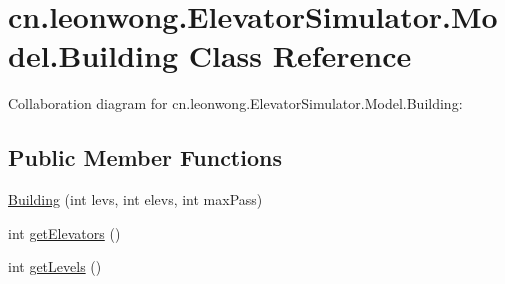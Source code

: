 \hypertarget{classcn_1_1leonwong_1_1_elevator_simulator_1_1_model_1_1_building}{}\section{cn.\+leonwong.\+Elevator\+Simulator.\+Model.\+Building Class Reference}
\label{classcn_1_1leonwong_1_1_elevator_simulator_1_1_model_1_1_building}


Collaboration diagram for cn.\+leonwong.\+Elevator\+Simulator.\+Model.\+Building\+:
\subsection*{Public Member Functions}
\begin{DoxyCompactItemize}
\item 
\hyperlink{classcn_1_1leonwong_1_1_elevator_simulator_1_1_model_1_1_building_a1e083b2c0741e1b45d620401f67b51c3}{Building} (int levs, int elevs, int max\+Pass)
\item 
int \hyperlink{classcn_1_1leonwong_1_1_elevator_simulator_1_1_model_1_1_building_a3cadfe7c0bcba1c58da3e4813985d713}{get\+Elevators} ()
\item 
int \hyperlink{classcn_1_1leonwong_1_1_elevator_simulator_1_1_model_1_1_building_a140ef7ab3469607bd537c51b3da5b833}{get\+Levels} ()
\end{DoxyCompactItemize}
